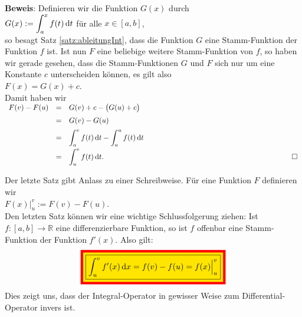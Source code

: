 \noindent
\textbf{Beweis}: Definieren wir die Funktion $G(x)$ durch 
\\[0.2cm]
\hspace*{1.3cm}
$\displaystyle G(x) := \int_a^x f(t)\, \textrm{d} t$ \quad f\"ur alle $x\in[a,b]$,
\\[0.2cm]
so besagt Satz \ref{satz:ableitungInt}, dass die Funktion $G$ eine Stamm-Funktion der
Funktion $f$ ist.  Ist nun $F$ eine beliebige weitere Stamm-Funktion von $f$, so haben wir
gerade gesehen, dass die Stamm-Funktionen $G$ und $F$ sich nur um eine Konstante $c$
unterscheiden k\"onnen, es gilt also
\\[0.2cm]
\hspace*{1.3cm}
$F(x) = G(x) + c$.
\\[0.2cm]
Damit haben wir 
\\[0.2cm]
\hspace*{1.3cm}
$
\begin{array}[t]{lcl}
  F(v) - F(u) & = & G(v) + c - \bigl(G(u) + c\bigr) \\[0.2cm]
              & = & G(v) - G(u)                     \\[0.2cm]
              & = & \ds\int_a^v f(t)\, \dr t - \int_a^u f(t)\, \dr t \\[0.3cm]
              & = & \ds\int_u^v f(t)\, \dr t. \hspace*{9cm} \Box  
\end{array}
$
\vspace*{0.3cm}

\noindent
Der letzte Satz gibt Anlass zu einer Schreibweise.  F\"ur eine Funktion $F$  definieren wir
\\[0.2cm]
\hspace*{1.3cm}
$F(x) \Big|_u^v := F(v) - F(u)$.
\\[0.2cm]
Den letzten Satz k\"onnen wir eine wichtige Schlussfolgerung ziehen:  Ist $f:[a,b] \rightarrow\mathbb{R}$
eine differenzierbare Funktion, so ist $f$ offenbar eine Stamm-Funktion der Funktion $f'(x)$.
Also gilt:
\begin{equation}
  \label{eq:hauptsatzKorollar}
  \colorbox{red}{\colorbox{orange}{\framebox{$\ds\int_u^v f'(x)\,\dr x = f(v) - f(u) = f(x)\Big|_u^v$}}}
\end{equation}
Dies zeigt uns, dass der Integral-Operator in gewisser Weise zum Differential-Operator invers ist.


